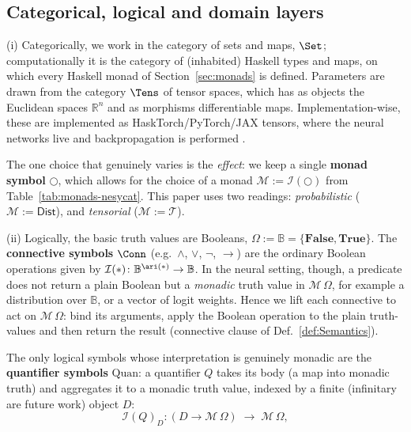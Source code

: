 \documentclass[anon]{../../journal-templates/NeSy26/nesy2026} %
\begin{document}
\subsection{Categorical, logical and domain layers}
\label{sec:layer-categorical-logical}

(i) Categorically, we work in the category of sets and maps, $\Set$; computationally it is the category of
(inhabited) Haskell types and maps, on which every Haskell monad of
Section~\ref{sec:monads} is defined. Parameters are drawn from the category $\Tens$ of tensor spaces, which has as objects the Euclidean spaces $\mathbb R^n$ and as morphisms differentiable maps. Implementation-wise, these are implemented as HaskTorch/PyTorch/JAX tensors, where the neural networks live and backpropagation is performed \citep{fongBackpropFunctor2019}. 

The one choice that genuinely varies is the
\emph{effect}: we keep a single \textbf{monad symbol} $\bigcirc$, which allows for the choice of a monad $\mathcal M := \mathcal I(\bigcirc)$ from Table~\ref{tab:monads-nesycat}. This paper uses two readings: \emph{probabilistic}
($\mathcal M := \mathsf{Dist}$), and \emph{tensorial} ($\mathcal M := \mathcal{T}$).

(ii) Logically, the basic truth values are Booleans, $\Omega := \mathbb B = \{\mathbf{False},\mathbf{True}\}$. The
\textbf{connective symbols} $\Conn$ (e.g.\ $\wedge$, $\vee$, $\neg$, $\rightarrow$) are the ordinary
Boolean operations \citep[D1.1]{johnstoneElephant2002} given by $\mathcal I({*}) \colon \mathbb B^{\ari(*)} \to \mathbb B$.
In the neural setting, though, a predicate does not return a plain Boolean but a \emph{monadic} truth value
in $\mathcal M\,\Omega$, for example a distribution over $\mathbb B$, or a vector of logit weights. Hence we lift each connective
to act on $\mathcal M\,\Omega$: bind its arguments, apply the Boolean operation to the plain truth-values
and then return the result (connective clause of Def.~\ref{def:Semantics}).

The only
logical symbols whose interpretation is genuinely monadic are the \textbf{quantifier
symbols} $\mathrm{Quan}$: a quantifier $Q$ takes its body (a map into monadic truth) and aggregates it to a monadic truth value, indexed by a finite (infinitary are future work) object $D$:
\[
  \mathcal I(Q)_D \colon (D \to \mathcal M\,\Omega) \;\longrightarrow\; \mathcal M\,\Omega,
\]
\end{document}
